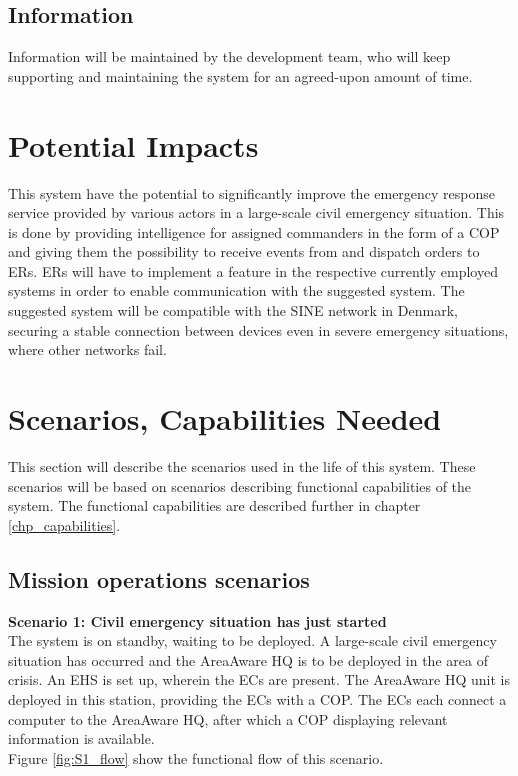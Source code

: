 \subsection{Information}
Information will be maintained by the development team, who will keep supporting and maintaining the system for an agreed-upon amount of time.


\section{Potential Impacts}
This system have the potential to significantly improve the emergency response service provided by various actors in a large-scale civil emergency situation. This is done by providing intelligence for assigned commanders in the form of a COP and giving them the possibility to receive events from and dispatch orders to ERs. ERs will have to implement a feature in the respective currently employed systems in order to enable communication with the suggested system. 
The suggested system will be compatible with the SINE network in Denmark, securing a stable connection between devices even in severe emergency situations, where other networks fail.


\newpage
\section{Scenarios, Capabilities Needed}
\label{sec_scenarios}
This section will describe the scenarios used	in the life of this system. These scenarios will be based on scenarios describing functional capabilities of the system. The functional capabilities are described further in chapter \ref{chp_capabilities}.

\subsection{Mission operations scenarios}
\noindent \textbf{Scenario 1: Civil emergency situation has just started} \\
The system is on standby, waiting to be deployed. 
A large-scale civil emergency situation has occurred and the AreaAware HQ is to be deployed in the area of crisis. An EHS is set up, wherein the ECs are present. The AreaAware HQ unit is deployed in this station, providing the ECs with a COP. The ECs each connect a computer to the AreaAware HQ, after which a COP displaying relevant information is available.\\
Figure \ref{fig:S1_flow} show the functional flow of this scenario. \\

